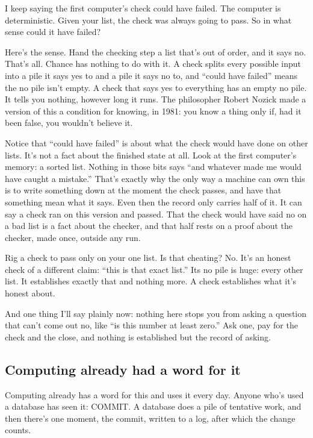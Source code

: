 \documentclass[11pt,twoside]{article}
\theoremstyle{thielethm}
\theoremstyle{thieledef}
\theoremstyle{thieledef}
\theoremstyle{thieledef}
\theoremstyle{thielethm}
\theoremstyle{thieleobs}
\theoremstyle{thielethm}
\begin{document}
I keep saying the first computer's check could have failed. The computer is deterministic. Given your list, the check was always going to pass. So in what sense could it have failed?

Here's the sense. Hand the checking step a list that's out of order, and it says no. That's all. Chance has nothing to do with it. A check splits every possible input into a pile it says yes to and a pile it says no to, and ``could have failed'' means the no pile isn't empty. A check that says yes to everything has an empty no pile. It tells you nothing, however long it runs. The philosopher Robert Nozick made a version of this a condition for knowing, in 1981: you know a thing only if, had it been false, you wouldn't believe it.

Notice that ``could have failed'' is about what the check would have done on other lists. It's not a fact about the finished state at all. Look at the first computer's memory: a sorted list. Nothing in those bits says ``and whatever made me would have caught a mistake.'' That's exactly why the only way a machine can own this is to write something down at the moment the check passes, and have that something mean what it says. Even then the record only carries half of it. It can say a check ran on this version and passed. That the check would have said no on a bad list is a fact about the checker, and that half rests on a proof about the checker, made once, outside any run.

Rig a check to pass only on your one list. Is that cheating? No. It's an honest check of a different claim: ``this is that exact list.'' Its no pile is huge: every other list. It establishes exactly that and nothing more. A check establishes what it's honest about.

And one thing I'll say plainly now: nothing here stops you from asking a question that can't come out no, like ``is this number at least zero.'' Ask one, pay for the check and the close, and nothing is established but the record of asking.

\subsection{Computing already had a word for it}

Computing already has a word for this and uses it every day. Anyone who's used a database has seen it: COMMIT. A database does a pile of tentative work, and then there's one moment, the commit, written to a log, after which the change counts.
\end{document}
